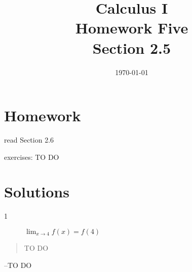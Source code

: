 \documentclass[letterpaper, landscape]{exam}
\title{Calculus I \\ Homework Five \\ Section 2.5}
\author{}
\date{\today}
\begin{document}
  \maketitle

  \section{Homework}
    \begin{itemize*}
      \item read Section 2.6
      \item exercises: TO DO
    \end{itemize*}

  \ifprintanswers

  \section{Solutions}

    \begin{description}

      \item[1] $\lim_{x \to 4} f(x) = f(4)$

    \end{description}

  \else
    \vspace{10 cm}
    \begin{quote}
      \begin{em}
        TO DO
      \end{em}
    \end{quote}
    \hspace{1 cm} --TO DO
  \fi
\end{document}
